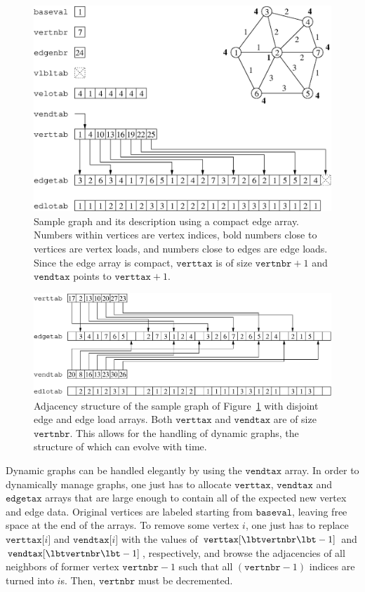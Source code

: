 \begin{figure}
\centering\includegraphics[scale=0.47]{s_f_gr1.eps}
\caption{Sample graph and its description using a compact edge
array. Numbers within vertices are vertex indices, bold numbers
close to vertices are vertex loads, and numbers close to edges are
edge loads. Since the edge array is compact, $\mathtt{verttax}$ is
of size $\mathtt{vertnbr} + 1$ and $\mathtt{vendtax}$ points to
$\mathtt{verttax} + 1$.}
\label{fig-lib-graf-one}
\end{figure}

\begin{figure}
\centering\includegraphics[scale=0.47]{s_f_gr2.eps}
\caption{Adjacency structure of the sample graph of
Figure~\protect\ref{fig-lib-graf-one} with disjoint edge and
edge load arrays. Both $\mathtt{verttax}$ and $\mathtt{vendtax}$ are
of size $\mathtt{vertnbr}$. This allows for the handling of dynamic
graphs, the structure of which can evolve with time.}
\label{fig-lib-graf-two}
\end{figure}

Dynamic graphs can be handled elegantly by using the
$\mathtt{vendtax}$ array. In order to dynamically manage graphs, one
just has to allocate $\mathtt{verttax}$, $\mathtt{vendtax}$ and
$\mathtt{edgetax}$ arrays that are large enough to contain all of the
expected new vertex and edge data. Original vertices are labeled
starting from $\mathtt{baseval}$, leaving free space at the end of the
arrays. To remove some vertex $i$, one just has to replace
$\mathtt{verttax[}i\mathtt{]}$ and
$\mathtt{vendtax[}i\mathtt{]}$ with the values of
$\mathtt{verttax[\lbt vertnbr}\lbt -1\mathtt{]}$ and
$\mathtt{vendtax[\lbt vertnbr}\lbt -1\mathtt{]}$, respectively, and
browse the adjacencies of all neighbors of former vertex
$\mathtt{vertnbr}-1$ such that all $(\mathtt{vertnbr}-1)$ indices are
turned into $i$s. Then, $\mathtt{vertnbr}$ must be decremented.

